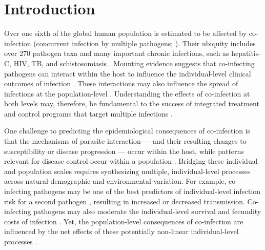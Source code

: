 \documentclass[10pt,letterpaper]{article}
\begin{document}
\linenumbers

\section*{Introduction}
Over one sixth of the global human population is estimated to be affected by co-infection (concurrent infection by multiple pathogens; \cite{griffiths_nature_2011}). 
Their ubiquity includes over 270 pathogen taxa and many important chronic infections, such as hepatitis-C, HIV, TB, and schistosomiasis \cite{griffiths_nature_2011, gandhi_extensively_2006, alter_epidemiology_2006}. 
Mounting evidence suggests that co-infecting pathogens can interact within the host to influence the individual-level clinical outcomes of infection \cite{beechler_enemies_2015, graham_malaria-filaria_2005}. 
These interactions may also influence the spread of infections at the population-level \cite{abu-raddad_dual_2006, ezenwa_opposite_2015}. 
Understanding the effects of co-infection at both levels may, therefore, be fundamental to the success of integrated treatment and control programs that target multiple infections \cite{abdool_karim_integration_2011, hotez_incorporating_2006}.


One challenge to predicting the epidemiological consequences of co-infection is that the mechanisms of parasite interaction — and their resulting changes to susceptibility or disease progression — occur within the host, while patterns relevant for disease control occur within a population \cite{viney_chapter_2013}. 
Bridging these individual and population scales requires synthesizing multiple, individual-level processes across natural demographic and environmental variation. 
For example, co-infecting pathogens may be one of the best predictors of individual-level infection risk for a second pathogen \cite{lello_relative_2013, telfer_species_2010}, resulting in increased or decreased transmission. 
Co-infecting pathogens may also moderate the individual-level survival and fecundity costs of infection \cite{beechler_enemies_2015, pedersen_interaction_2008}. 
Yet, the population-level consequences of co-infection are influenced by the net effects of these potentially non-linear individual-level processes \cite{martcheva_role_2006, vasco_tracking_2007}.
\end{document}

